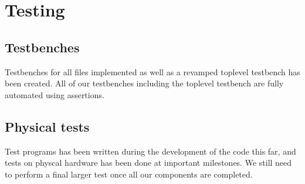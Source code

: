 \section{Testing}

\subsection{Testbenches}
Testbenches for all files implemented as well as a revamped toplevel testbench has
been created. All of our testbenches including the toplevel testbench are fully
automated using assertions.

\subsection{Physical tests}
Test programs has been written during the development of the code this far, and 
tests on physcal hardware has been done at important milestones. We still need
to perform a final larger test once all our components are completed.
